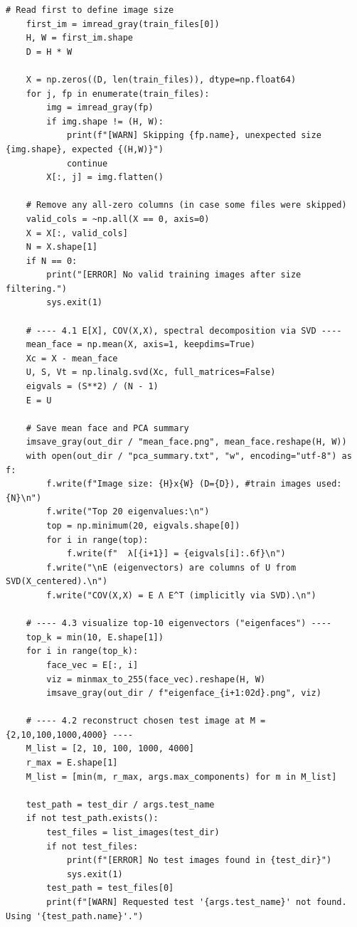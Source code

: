 \documentclass[12pt]{article}
\begin{document}
\begin{lstlisting}[style=pythonstyle, caption={P4 Eigenfaces Implementation (eigenface.py)}]
    # Read first to define image size
    first_im = imread_gray(train_files[0])
    H, W = first_im.shape
    D = H * W

    X = np.zeros((D, len(train_files)), dtype=np.float64)
    for j, fp in enumerate(train_files):
        img = imread_gray(fp)
        if img.shape != (H, W):
            print(f"[WARN] Skipping {fp.name}, unexpected size {img.shape}, expected {(H,W)}")
            continue
        X[:, j] = img.flatten()

    # Remove any all-zero columns (in case some files were skipped)
    valid_cols = ~np.all(X == 0, axis=0)
    X = X[:, valid_cols]
    N = X.shape[1]
    if N == 0:
        print("[ERROR] No valid training images after size filtering.")
        sys.exit(1)

    # ---- 4.1 E[X], COV(X,X), spectral decomposition via SVD ----
    mean_face = np.mean(X, axis=1, keepdims=True)
    Xc = X - mean_face
    U, S, Vt = np.linalg.svd(Xc, full_matrices=False)
    eigvals = (S**2) / (N - 1)
    E = U

    # Save mean face and PCA summary
    imsave_gray(out_dir / "mean_face.png", mean_face.reshape(H, W))
    with open(out_dir / "pca_summary.txt", "w", encoding="utf-8") as f:
        f.write(f"Image size: {H}x{W} (D={D}), #train images used: {N}\n")
        f.write("Top 20 eigenvalues:\n")
        top = np.minimum(20, eigvals.shape[0])
        for i in range(top):
            f.write(f"  λ[{i+1}] = {eigvals[i]:.6f}\n")
        f.write("\nE (eigenvectors) are columns of U from SVD(X_centered).\n")
        f.write("COV(X,X) = E Λ E^T (implicitly via SVD).\n")

    # ---- 4.3 visualize top-10 eigenvectors ("eigenfaces") ----
    top_k = min(10, E.shape[1])
    for i in range(top_k):
        face_vec = E[:, i]
        viz = minmax_to_255(face_vec).reshape(H, W)
        imsave_gray(out_dir / f"eigenface_{i+1:02d}.png", viz)

    # ---- 4.2 reconstruct chosen test image at M = {2,10,100,1000,4000} ----
    M_list = [2, 10, 100, 1000, 4000]
    r_max = E.shape[1]
    M_list = [min(m, r_max, args.max_components) for m in M_list]

    test_path = test_dir / args.test_name
    if not test_path.exists():
        test_files = list_images(test_dir)
        if not test_files:
            print(f"[ERROR] No test images found in {test_dir}")
            sys.exit(1)
        test_path = test_files[0]
        print(f"[WARN] Requested test '{args.test_name}' not found. Using '{test_path.name}'.")


\end{lstlisting}
\end{document}
